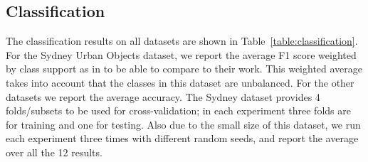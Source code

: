 \documentclass{bmvc2k}
\begin{document}
\subsection{Classification}
The classification results on all datasets are shown in Table~\ref{table:classification}.
For the Sydney Urban Objects dataset, we report the average F1 score weighted by class support as in \cite{wu_3D_2015} to be able to compare to their work. This weighted average takes into account that the classes in this dataset are unbalanced. For the other datasets we report the average accuracy. The Sydney dataset provides 4 folds/subsets to be used for cross-validation; in each experiment three folds are for training and one for testing. Also due to the small size of this dataset, we run each experiment three times with different random seeds, and report the average over all the 12 results.
\end{document}
